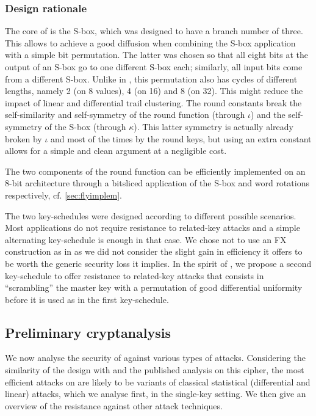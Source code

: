 \subsubsection*{Design rationale}
The core of \fly is the \littlunOne S-box, which was designed to have a branch number of three. This allows to achieve a good diffusion when combining the S-box
application with a simple bit permutation. The latter was chosen so that all eight bits at the output of an S-box go to one different S-box each; similarly, all
input bits come from a different S-box. Unlike in \present, this permutation also has cycles of different lengths,
namely 2 (on 8 values), 4 (on 16) and 8 (on 32). This might reduce the impact of linear and differential trail clustering.
The round constants break the self-similarity and self-symmetry of the round function (through $\iota$)
and the self-symmetry of the S-box (through $\kappa$). This latter symmetry is actually already broken by $\iota$ and most of the times by the round keys, but using an
extra constant allows for a simple and clean argument at a negligible cost.

The two components of the round function can be efficiently implemented on an 8-bit architecture through a bitsliced
application of the S-box and word rotations respectively, cf. \autoref{sec:flyimplem}.

The two key-schedules were designed according to different possible scenarios. Most applications do not require resistance to related-key attacks and a simple
alternating key-schedule is enough in that case. We chose not to use an FX construction as in \pride as we did not consider the slight gain in efficiency
it offers to be worth the generic security loss it implies. In the spirit of \noekeon, we propose a second key-schedule to offer resistance to related-key attacks
that consists in ``scrambling'' the master key with a permutation of good differential uniformity before it is used as in the first key-schedule.

\subsection{Preliminary cryptanalysis}

We now analyse the security of \fly against various types of attacks. Considering the similarity of the design with \present and the published analysis on this cipher, the
most efficient attacks on \fly are likely to be variants of classical statistical (differential and linear) attacks, which we analyse first, in the single-key setting.
We then give an overview of the resistance against other attack techniques.

